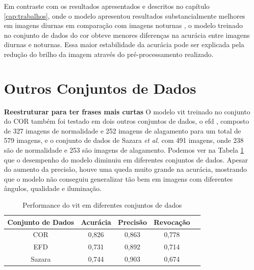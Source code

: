 Em contraste com os resultados apresentados e descritos no capítulo \ref{cap:trabalhos}, 
onde o modelo apresentou resultados substancialmente melhores em imagens diurnas em comparação com imagens noturnas \cite{piedad2022},
o modelo treinado no conjunto de dados do \acrshort{cor} obteve menores diferenças na acurácia entre imagens diurnas e noturnas.
Essa maior estabilidade da acurácia pode ser explicada pela redução do brilho da imagem através do pré-processamento realizado.
\section{Outros Conjuntos de Dados}\label{sec:resultados_outros}
\textbf{Reestruturar para ter frases mais curtas}
O modelo \acrshort{vit} treinado no conjunto do COR também foi testado em dois outros conjuntos de dados, 
o \acrfull{efd} \cite{BarzSchroeterMuench2018_1000117723}, composto de 327 imagens de normalidade e 252 imagens de alagamento para um total de 579 imagens,
e o conjunto de dados de Sazara \textit{et al.} \cite{sazara2019} com 491 imagens, onde 238 são de normalidade e 253 são imagens de alagamento. 
Podemos ver na Tabela \ref{tab:vitperformance} que o desempenho do modelo diminuiu em diferentes conjuntos de dados. 
Apesar do aumento da precisão, houve uma queda muito grande na acurácia, mostrando que o modelo não conseguiu generalizar tão bem em imagens com diferentes ângulos, qualidade e iluminação.

\begin{table}[tb]
\caption{\label{tab:vitperformance} Performance do \acrshort{vit} em diferentes conjuntos de dados}
\begin{center}
\begin{tabular}{c|cccc}
\toprule
 Conjunto de Dados & Acurácia & Precisão & Revocação \\
\midrule
     COR & 0,826 & 0,863 & 0,778 \\
     EFD & 0,731 & 0,892 & 0,714 \\
     Sazara & 0,744 & 0,903 & 0,674 \\
\bottomrule
\end{tabular}
\end{center}
\end{table}


